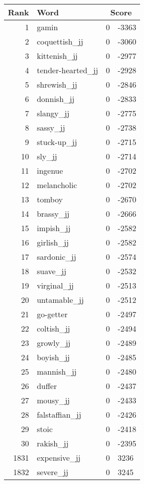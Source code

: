 \begin{longtable}[!htbp]{| rlr@{.}l |}
    \hline
    \textbf{Rank} & \textbf{Word} & \multicolumn{2}{c|}{\textbf{Score}} \\
    \hline
    \endhead
    1 & gamin & 0 & -3363 \\
    2 & coquettish\_jj & 0 & -3060 \\
    3 & kittenish\_jj & 0 & -2977 \\
    4 & tender-hearted\_jj & 0 & -2928 \\
    5 & shrewish\_jj & 0 & -2846 \\
    6 & donnish\_jj & 0 & -2833 \\
    7 & slangy\_jj & 0 & -2775 \\
    8 & sassy\_jj & 0 & -2738 \\
    9 & stuck-up\_jj & 0 & -2715 \\
    10 & sly\_jj & 0 & -2714 \\
    11 & ingenue & 0 & -2702 \\
    12 & melancholic & 0 & -2702 \\
    13 & tomboy & 0 & -2670 \\
    14 & brassy\_jj & 0 & -2666 \\
    15 & impish\_jj & 0 & -2582 \\
    16 & girlish\_jj & 0 & -2582 \\
    17 & sardonic\_jj & 0 & -2574 \\
    18 & suave\_jj & 0 & -2532 \\
    19 & virginal\_jj & 0 & -2513 \\
    20 & untamable\_jj & 0 & -2512 \\
    21 & go-getter & 0 & -2497 \\
    22 & coltish\_jj & 0 & -2494 \\
    23 & growly\_jj & 0 & -2489 \\
    24 & boyish\_jj & 0 & -2485 \\
    25 & mannish\_jj & 0 & -2480 \\
    26 & duffer & 0 & -2437 \\
    27 & mousy\_jj & 0 & -2433 \\
    28 & falstaffian\_jj & 0 & -2426 \\
    29 & stoic & 0 & -2418 \\
    30 & rakish\_jj & 0 & -2395 \\
    1831 & expensive\_jj & 0 & 3236 \\
    1832 & severe\_jj & 0 & 3245 \\

\end{longtable}
